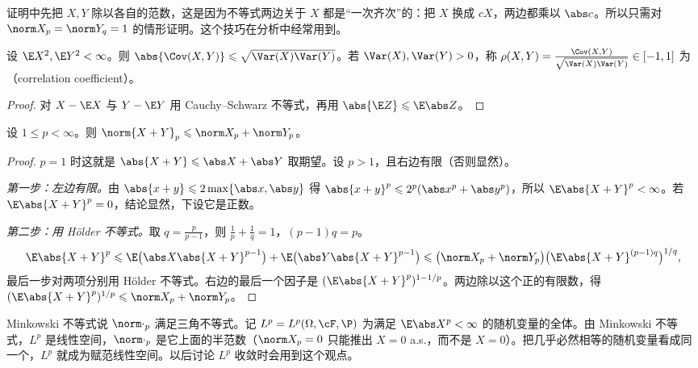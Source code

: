 \begin{remark}[归一化的技巧]
证明中先把 $X,Y$ 除以各自的范数，这是因为不等式两边关于 $X$ 都是“一次齐次”的：把 $X$ 换成 $cX$，两边都乘以 $\abs c$。所以只需对 $\norm X_p=\norm Y_q=1$ 的情形证明。这个技巧在分析中经常用到。
\end{remark}

\begin{corollary}[相关系数]\label{cor:expectation:correlation}
设 $\E X^2,\E Y^2<\infty$。则 $\abs{\Cov(X,Y)}\leqslant\sqrt{\Var(X)\Var(Y)}$。若 $\Var(X),\Var(Y)>0$，称 $\rho(X,Y)=\frac{\Cov(X,Y)}{\sqrt{\Var(X)\Var(Y)}}\in[-1,1]$ 为（correlation coefficient）。
\end{corollary}
\begin{proof}
对 $X-\E X$ 与 $Y-\E Y$ 用 Cauchy--Schwarz 不等式，再用 $\abs{\E Z}\leqslant \E\abs Z$。
\end{proof}

\begin{theorem}\label{thm:expectation:minkowski}
设 $1\leqslant p<\infty$。则 $\norm{X+Y}_p\leqslant\norm X_p+\norm Y_p$。
\end{theorem}
\begin{proof}
$p=1$ 时这就是 $\abs{X+Y}\leqslant\abs X+\abs Y$ 取期望。设 $p>1$，且右边有限（否则显然）。

\emph{第一步：左边有限。}由 $\abs{x+y}\leqslant2\max\{\abs x,\abs y\}$ 得 $\abs{x+y}^p\leqslant2^p(\abs x^p+\abs y^p)$，所以 $\E\abs{X+Y}^p<\infty$。若 $\E\abs{X+Y}^p=0$，结论显然，下设它是正数。

\emph{第二步：用 Hölder 不等式。}取 $q=\frac p{p-1}$，则 $\frac1p+\frac1q=1$，$(p-1)q=p$。
\[
\E\abs{X+Y}^p\leqslant \E\bigl(\abs X\abs{X+Y}^{p-1}\bigr)+\E\bigl(\abs Y\abs{X+Y}^{p-1}\bigr)\leqslant\bigl(\norm X_p+\norm Y_p\bigr)\bigl(\E\abs{X+Y}^{(p-1)q}\bigr)^{1/q},
\]
最后一步对两项分别用 Hölder 不等式。右边的最后一个因子是 $(\E\abs{X+Y}^p)^{1-1/p}$。两边除以这个正的有限数，得 $(\E\abs{X+Y}^p)^{1/p}\leqslant\norm X_p+\norm Y_p$。
\end{proof}

Minkowski 不等式说 $\norm\cdot_p$ 满足三角不等式。记 $L^p=L^p(\Omega,\cF,\P)$ 为满足 $\E\abs X^p<\infty$ 的随机变量的全体。由 Minkowski 不等式，$L^p$ 是线性空间，$\norm\cdot_p$ 是它上面的半范数（$\norm X_p=0$ 只能推出 $X=0$ a.s.，而不是 $X=0$）。把几乎必然相等的随机变量看成同一个，$L^p$ 就成为赋范线性空间。以后讨论 $L^p$ 收敛时会用到这个观点。


